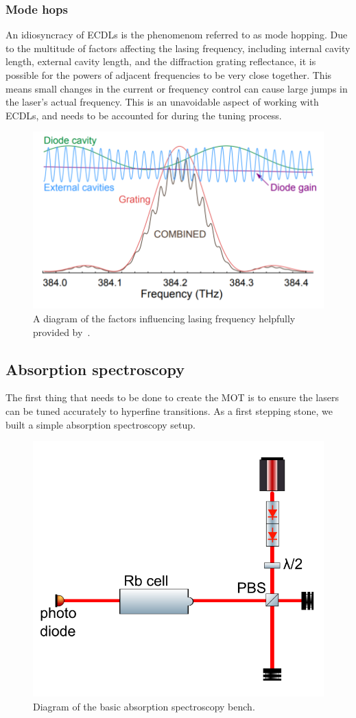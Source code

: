 \documentclass[11pt,twoside,a4paper]{article}
\begin{document}
\subsubsection{Mode hops}
An idiosyncracy of ECDLs is the phenomenom referred to as mode hopping. Due to the multitude of factors affecting the lasing frequency, including
internal cavity length, external cavity length, and the diffraction grating reflectance, it is possible for the powers of adjacent frequencies to be
very close together. This means small changes in the current or frequency control can cause large jumps in the laser's actual frequency. This is an
unavoidable aspect of working with ECDLs, and needs to be accounted for during the tuning process.
\begin{figure}[h]
    \centering
    \includegraphics[width=.5\textwidth]{images/mode-hops}
    \caption{A diagram of the factors influencing lasing frequency helpfully provided by~\cite{moglabsecd}.}
\end{figure}
\subsection{Absorption spectroscopy}
The first thing that needs to be done to create the MOT is to ensure the lasers can be tuned accurately to hyperfine transitions. As a
first stepping stone, we built a simple absorption spectroscopy setup.
\begin{figure}[h]
    \centering
    \includegraphics[width=.5\textwidth]{images/abs-setup}
    \caption{Diagram of the basic absorption spectroscopy bench.}
\end{figure}
\end{document}
